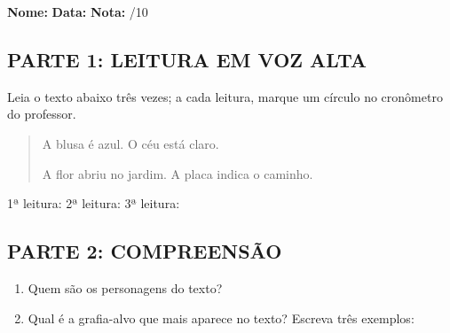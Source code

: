 \begin{exercicio}

\noindent\textbf{Nome:} \underline{\hspace{3.2cm}} \quad \textbf{Data:} \underline{\hspace{1.6cm}} \quad \textbf{Nota:} \underline{\hspace{0.9cm}}/10


\subsection*{PARTE 1: LEITURA EM VOZ ALTA}

Leia o texto abaixo três vezes; a cada leitura, marque um círculo no cronômetro do professor.

\begin{quote}
A blusa é azul. O céu está claro.

A flor abriu no jardim. A placa indica o caminho.
\end{quote}

\begin{center}
1ª leitura: \underline{\hspace{1.5cm}} \quad 2ª leitura: \underline{\hspace{1.5cm}} \quad 3ª leitura: \underline{\hspace{1.5cm}}
\end{center}

\subsection*{PARTE 2: COMPREENSÃO}

\begin{enumerate}

  \item Quem são os personagens do texto?
  \begin{center}
  \underline{\hspace{12cm}}
  \end{center}

  \item Qual é a grafia-alvo que mais aparece no texto? Escreva três exemplos:
  \begin{center}
  \underline{\hspace{3.5cm}} \quad \underline{\hspace{3.5cm}} \quad \underline{\hspace{3.5cm}}
  \end{center}


\end{enumerate}
\end{exercicio}
